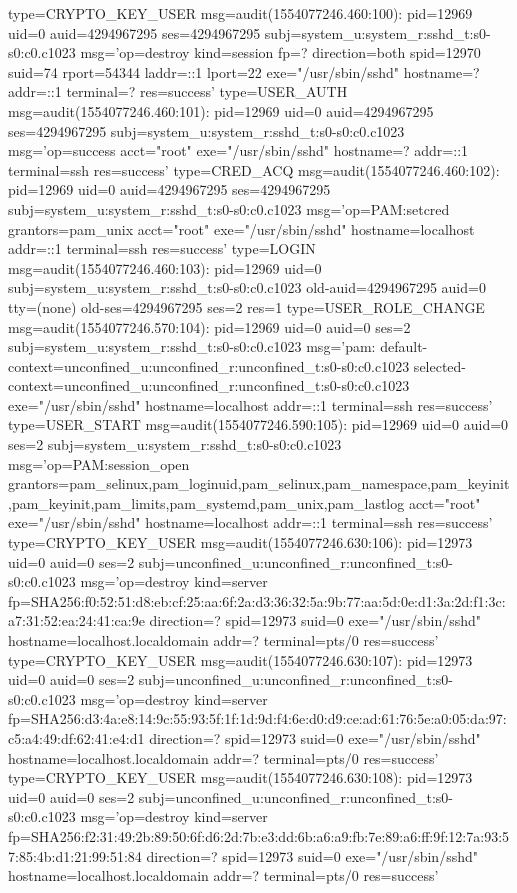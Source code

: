 \documentclass[]{report}
\newenvironment{Shaded}{}{}
\newcommand{\NormalTok}[1]{#1}
\begin{document}
\begin{Shaded}
\begin{Highlighting}[]
\NormalTok{type=CRYPTO_KEY_USER msg=audit(1554077246.460:100): pid=12969 uid=0 auid=4294967295 ses=4294967295 subj=system_u:system_r:sshd_t:s0-s0:c0.c1023 msg='op=destroy kind=session fp=? direction=both spid=12970 suid=74 rport=54344 laddr=::1 lport=22  exe="/usr/sbin/sshd" hostname=? addr=::1 terminal=? res=success'}
\NormalTok{type=USER_AUTH msg=audit(1554077246.460:101): pid=12969 uid=0 auid=4294967295 ses=4294967295 subj=system_u:system_r:sshd_t:s0-s0:c0.c1023 msg='op=success acct="root" exe="/usr/sbin/sshd" hostname=? addr=::1 terminal=ssh res=success'}
\NormalTok{type=CRED_ACQ msg=audit(1554077246.460:102): pid=12969 uid=0 auid=4294967295 ses=4294967295 subj=system_u:system_r:sshd_t:s0-s0:c0.c1023 msg='op=PAM:setcred grantors=pam_unix acct="root" exe="/usr/sbin/sshd" hostname=localhost addr=::1 terminal=ssh res=success'}
\NormalTok{type=LOGIN msg=audit(1554077246.460:103): pid=12969 uid=0 subj=system_u:system_r:sshd_t:s0-s0:c0.c1023 old-auid=4294967295 auid=0 tty=(none) old-ses=4294967295 ses=2 res=1}
\NormalTok{type=USER_ROLE_CHANGE msg=audit(1554077246.570:104): pid=12969 uid=0 auid=0 ses=2 subj=system_u:system_r:sshd_t:s0-s0:c0.c1023 msg='pam: default-context=unconfined_u:unconfined_r:unconfined_t:s0-s0:c0.c1023 selected-context=unconfined_u:unconfined_r:unconfined_t:s0-s0:c0.c1023 exe="/usr/sbin/sshd" hostname=localhost addr=::1 terminal=ssh res=success'}
\NormalTok{type=USER_START msg=audit(1554077246.590:105): pid=12969 uid=0 auid=0 ses=2 subj=system_u:system_r:sshd_t:s0-s0:c0.c1023 msg='op=PAM:session_open grantors=pam_selinux,pam_loginuid,pam_selinux,pam_namespace,pam_keyinit,pam_keyinit,pam_limits,pam_systemd,pam_unix,pam_lastlog acct="root" exe="/usr/sbin/sshd" hostname=localhost addr=::1 terminal=ssh res=success'}
\NormalTok{type=CRYPTO_KEY_USER msg=audit(1554077246.630:106): pid=12973 uid=0 auid=0 ses=2 subj=unconfined_u:unconfined_r:unconfined_t:s0-s0:c0.c1023 msg='op=destroy kind=server fp=SHA256:f0:52:51:d8:eb:cf:25:aa:6f:2a:d3:36:32:5a:9b:77:aa:5d:0e:d1:3a:2d:f1:3c:a7:31:52:ea:24:41:ca:9e direction=? spid=12973 suid=0  exe="/usr/sbin/sshd" hostname=localhost.localdomain addr=? terminal=pts/0 res=success'}
\NormalTok{type=CRYPTO_KEY_USER msg=audit(1554077246.630:107): pid=12973 uid=0 auid=0 ses=2 subj=unconfined_u:unconfined_r:unconfined_t:s0-s0:c0.c1023 msg='op=destroy kind=server fp=SHA256:d3:4a:e8:14:9c:55:93:5f:1f:1d:9d:f4:6e:d0:d9:ce:ad:61:76:5e:a0:05:da:97:c5:a4:49:df:62:41:e4:d1 direction=? spid=12973 suid=0  exe="/usr/sbin/sshd" hostname=localhost.localdomain addr=? terminal=pts/0 res=success'}
\NormalTok{type=CRYPTO_KEY_USER msg=audit(1554077246.630:108): pid=12973 uid=0 auid=0 ses=2 subj=unconfined_u:unconfined_r:unconfined_t:s0-s0:c0.c1023 msg='op=destroy kind=server fp=SHA256:f2:31:49:2b:89:50:6f:d6:2d:7b:e3:dd:6b:a6:a9:fb:7e:89:a6:ff:9f:12:7a:93:57:85:4b:d1:21:99:51:84 direction=? spid=12973 suid=0  exe="/usr/sbin/sshd" hostname=localhost.localdomain addr=? terminal=pts/0 res=success'}

\end{Highlighting}
\end{Shaded}
\end{document}
